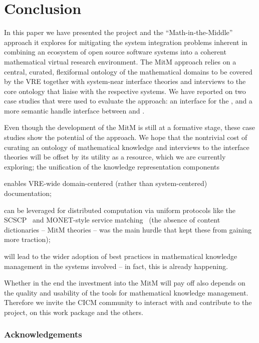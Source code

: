 \section{Conclusion}\label{sec:concl}
In this paper we have presented the \ODK project and the ``Math-in-the-Middle'' approach
it explores for mitigating the system integration problems inherent in combining an ecosystem
of open source software systems into a coherent mathematical virtual research environment.
The MitM approach relies on a central, curated, flexiformal ontology of the mathematical
domains to be covered by the VRE together with system-near interface theories and
interviews to the core ontology that liaise with the respective systems. We have reported
on two case studies that were used to evaluate the approach: an interface for the \LMFDB,
and a more semantic handle interface between \GAP and \Sage.

Even though the development of the MitM is still at a formative stage, these case studies
show the potential of the approach. We hope that the nontrivial cost of curating an
ontology of mathematical knowledge and interviews to the interface theories will be offset
by its utility as a resource, which we are currently exploring; the unification of the
knowledge representation components
\begin{compactitem}
\item enables VRE-wide domain-centered (rather than system-centered) documentation;
\item can be leveraged for distributed computation via uniform protocols like the
  SCSCP~\cite{HorRoz:ossp09} and MONET-style service
  matching~\cite{CaprottiEtAl:MathServiceMatching04:tr} (the absence of content
  dictionaries -- MitM theories -- was the main hurdle that kept these from gaining more
  traction);
\item will lead to the wider adoption of best practices in
  mathematical knowledge management in the systems involved -- in
  fact, this is already happening.
\end{compactitem}
Whether in the end the investment into the MitM will pay off also depends on the quality
and usability of the tools for mathematical knowledge management. Therefore we invite the
CICM community to interact with and contribute to the \ODK project, on
this work package and the others.

\subsubsection*{Acknowledgements}

